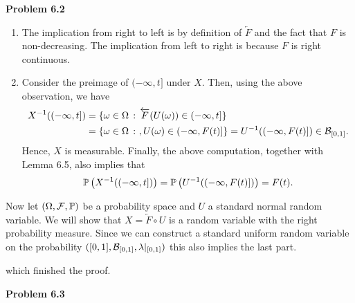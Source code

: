 \documentclass{lecturenotes}
\begin{document}
\textbf{Problem 6.2}
\begin{enumerate}[label=(\alph*)]
\item The implication from right to left is by definition of $\overleftarrow{F}$ and the fact that $F$ is non-decreasing. The implication from left to right is because $F$ is right continuous.
\item Consider the preimage of $(-\infty, t]$ under $X$. Then, using the above observation, we have
\begin{align*}
	X^{-1}((-\infty,t]) &= \{\omega \in \Omega \, : \, \overleftarrow{F}(U(\omega)) \in (-\infty,t]\}\\
	&= \{\omega \in \Omega \, :\ , U(\omega) \in (-\infty, F(t)]\} = U^{-1}((-\infty, F(t)]) \in \mathcal B_{[0,1]}.
\end{align*}
Hence, $X$ is measurable. Finally, the above computation, together with Lemma 6.5, also implies that
\[
	\mathbb P\left(X^{-1}((-\infty,t])\right) = \mathbb P\left(U^{-1}((-\infty, F(t)])\right) = F(t).
\]
\end{enumerate}


Now let $(\Omega,\mathcal F, \mathbb P)$ be a probability space and $U$ a standard normal random variable. We will show that $X = \overleftarrow{F} \circ U$ is a random variable with the right probability measure. Since we can construct a standard uniform random variable on the probability $([0,1], \mathcal B_{[0,1]}, \lambda|_{[0,1]})$ this also implies the last part. 


which finished the proof.

\bigskip

\textbf{Problem 6.3}
\end{document}
